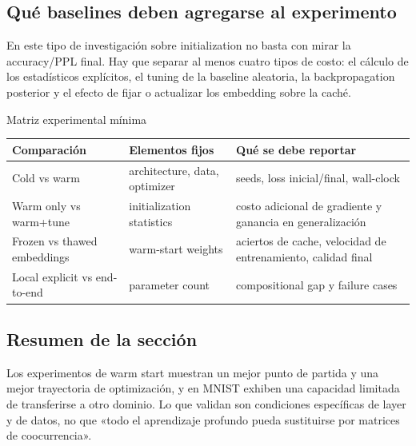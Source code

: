

\subsection{Qué baselines deben agregarse al experimento}

En este tipo de investigación sobre initialization no basta con mirar la accuracy/PPL final. Hay que separar al menos cuatro tipos de costo: el cálculo de los estadísticos explícitos, el tuning de la baseline aleatoria, la backpropagation posterior y el efecto de fijar o actualizar los embedding sobre la caché.

\begin{knowledgebox}{Matriz experimental mínima}
\begin{tabularx}{\textwidth}{L{0.18\textwidth} L{0.24\textwidth} X}
\toprule
Comparación & Elementos fijos & Qué se debe reportar \\
\midrule
Cold vs warm & architecture, data, optimizer & seeds, loss inicial/final, wall-clock \\
Warm only vs warm+tune & initialization statistics & costo adicional de gradiente y ganancia en generalización \\
Frozen vs thawed embeddings & warm-start weights & aciertos de cache, velocidad de entrenamiento, calidad final \\
Local explicit vs end-to-end & parameter count & compositional gap y failure cases \\
\bottomrule
\end{tabularx}
\end{knowledgebox}

\subsection{Resumen de la sección}

Los experimentos de warm start muestran un mejor punto de partida y una mejor trayectoria de optimización, y en MNIST exhiben una capacidad limitada de transferirse a otro dominio. Lo que validan son condiciones específicas de layer y de datos, no que «todo el aprendizaje profundo pueda sustituirse por matrices de coocurrencia».
